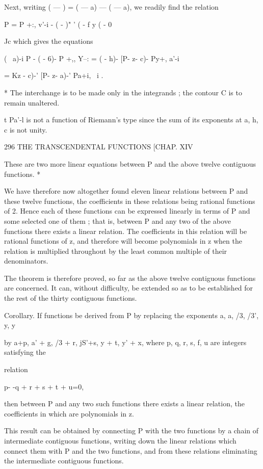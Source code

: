 Next, writing (  —  ) = (  — a) — (  — a), we readily find the relation 

P =   P +:, v'-i - (  -  )" ' (  - f y (  - 0  

Jc 
which gives the equations 

(  \  a)-i  P - (  - 6)- P +,, Y--:  = (  - h)-  [P- z- c)-  Py+, a'-i  

= Kz - c)-' [P- z- a)-' Pa+i,  \ i . 

* The interchange is to be made only in the integrands ; the contour C is to remain 
unaltered. 

t Pa'-l is not a function of Riemann's type since the sum of its exponents at a, h, c is not 
unity. 



296 THE TRANSCENDENTAL FUNCTIONS [CHAP. XIV 

These are two more linear equations between P and the above twelve 
contiguous functions. * 

We have therefore now altogether found eleven linear relations between 
P and these twelve functions, the coefficients in these relations being rational 
functions of 2. Hence each of these functions can be expressed linearly in 
terms of P and some selected one of them ; that is, between P and any two of 
the above functions there exists a linear relation. The coefficients in this 
relation will be rational functions of z, and therefore will become polynomials 
in z when the relation is multiplied throughout by the least common multiple 
of their denominators. 

The theorem is therefore proved, so far as the above twelve contiguous 
functions are concerned. It can, without difficulty, be extended so as to be 
established for the rest of the thirty contiguous functions. 

Corollary. If functions be derived from P by replacing the exponents a, a, /3, /3', y, y 

by a+p, a' + g, /3 + r, jS'+s, y + t, y' + x, where p, q, r, s, f, u are integers satisfying the 

relation 

p- -q + r + s + t + u=0, 

then between P and any two such functions there exists a linear relation, the coefficients 
in which are polynomials in z. 

This result can be obtained by connecting P with the two functions by a chain of 
intermediate contiguous functions, writing down the linear relations which connect them 
with P and the two functions, and from these relations eliminating the intermediate 
contiguous functions. 

